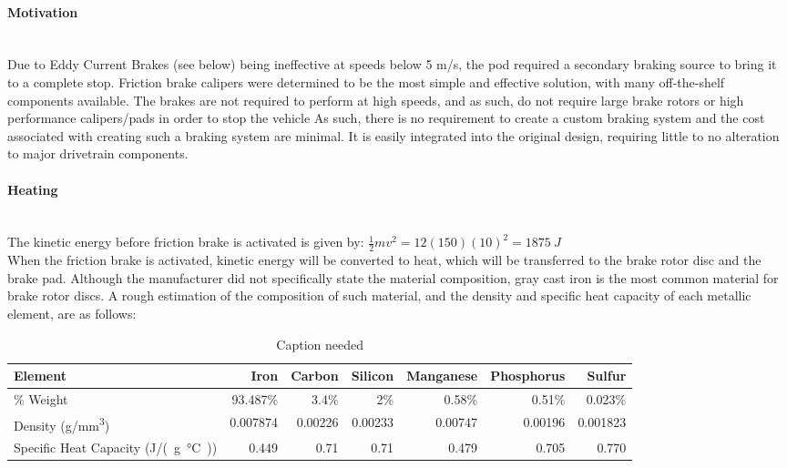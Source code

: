 \documentclass{report}
\let\oldparagraph\paragraph
\renewcommand{\paragraph}[1]{\oldparagraph{#1}\mbox{}\\}
\begin{document}
    \paragraph{Motivation}
    Due to Eddy Current Brakes (see below) being ineffective at speeds below 5 m/s, the pod required a secondary braking source to bring it to a complete stop. Friction brake calipers were determined to be the most simple and effective solution, with many off-the-shelf components available. The brakes are not required to perform at high speeds, and as such, do not require large brake rotors or high performance calipers/pads in order to stop the vehicle  As such, there is no requirement to create a custom braking system and the cost associated with creating such a braking system are minimal. It is easily integrated into the original design, requiring little to no alteration to major drivetrain components.\\
    
    \paragraph{Heating}
    The kinetic energy before friction brake is activated is given by: $\frac{1}{2}mv^2=12(150)(10)^2=\SI{1875}{J}$\\
    When the friction brake is activated, kinetic energy will be converted to heat, which will be transferred to the brake rotor disc and the brake pad.
    Although the manufacturer did not specifically state the material composition, gray cast iron is the most common material for brake rotor discs. A rough estimation of the composition of such material, and the density and specific heat capacity of each metallic element, are as follows:\\
    
    \begin{table}[H]
        \centering
        \begin{tabular}{@{}lrrrrrr@{}} \toprule
            Element & Iron & Carbon & Silicon & Manganese & Phosphorus & Sulfur\\ \midrule
            \% Weight & 93.487\% & 3.4\% & 2\% & 0.58\% & 0.51\% & 0.023\%\\
            Density (\si{g/mm^3}) & 0.007874 & 0.00226 & 0.00233 & 0.00747 & 0.00196 & 0.001823\\
            Specific Heat Capacity (\si{J/(g\celsius)}) & 0.449 & 0.71 & 0.71 & 0.479 & 0.705 & 0.770\\ \bottomrule
        \end{tabular}
        \caption{Caption needed}
    \end{table}
    
\end{document}
